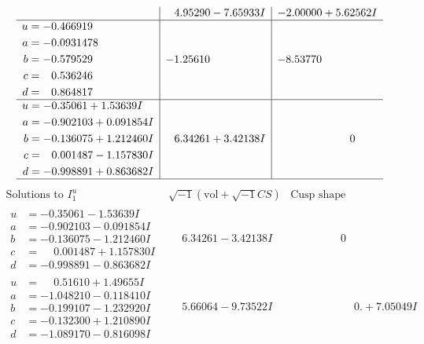 \documentclass[1p]{elsarticle_modified}
\theoremstyle{definition}
\newcommand{\I}{\sqrt{-1}}
\begin{document}
$$\begin{array}{c|c|c}
 & \phantom{-}4.95290 - 7.65933 I & -2.00000 + 5.62562 I \\ \hline\begin{aligned}
u &= -0.466919\phantom{ +0.000000I} \\
a &= -0.0931478\phantom{ +0.000000I} \\
b &= -0.579529\phantom{ +0.000000I} \\
c &= \phantom{-}0.536246\phantom{ +0.000000I} \\
d &= \phantom{-}0.864817\phantom{ +0.000000I}\end{aligned}
 & -1.25610\phantom{ +0.000000I} & -8.53770\phantom{ +0.000000I} \\ \hline\begin{aligned}
u &= -0.35061 + 1.53639 I \\
a &= -0.902103 + 0.091854 I \\
b &= -0.136075 + 1.212460 I \\
c &= \phantom{-}0.001487 - 1.157830 I \\
d &= -0.998891 + 0.863682 I\end{aligned}
 & \phantom{-}6.34261 + 3.42138 I & \phantom{-0.000000 } 0\\
 \hline 
 \end{array}$$\newpage$$\begin{array}{c|c|c}  
\text{Solutions to }I^u_{1}& \I (\text{vol} + \sqrt{-1}CS) & \text{Cusp shape}\\
 \hline 
\begin{aligned}
u &= -0.35061 - 1.53639 I \\
a &= -0.902103 - 0.091854 I \\
b &= -0.136075 - 1.212460 I \\
c &= \phantom{-}0.001487 + 1.157830 I \\
d &= -0.998891 - 0.863682 I\end{aligned}
 & \phantom{-}6.34261 - 3.42138 I & \phantom{-0.000000 } 0 \\ \hline\begin{aligned}
u &= \phantom{-}0.51610 + 1.49655 I \\
a &= -1.048210 - 0.118410 I \\
b &= -0.199107 - 1.232920 I \\
c &= -0.132300 + 1.210890 I \\
d &= -1.089170 - 0.816098 I\end{aligned}
 & \phantom{-}5.66064 - 9.73522 I & \phantom{-0.000000 -}0. + 7.05049 I \\ \hline\begin{aligned}

\end{aligned}
\end{array}$$
\end{document}
